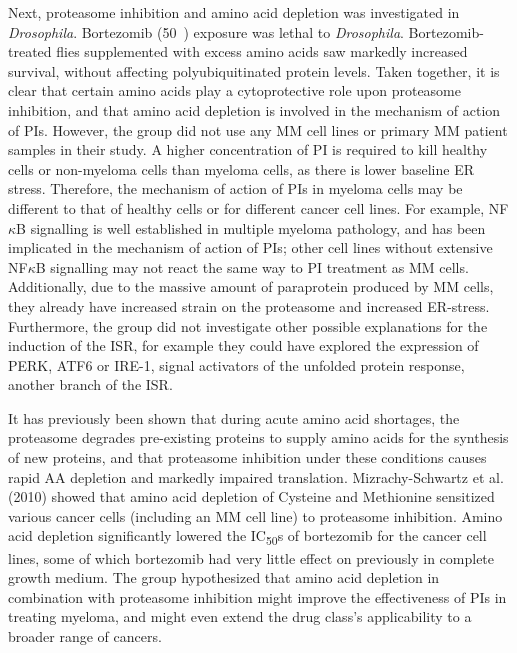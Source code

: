 Next, proteasome inhibition and amino acid depletion was investigated in \textit{Drosophila}\cite{suraweera2012failure}.
Bortezomib (50\si{\micro\Molar}) exposure was lethal to \textit{Drosophila}.
Bortezomib-treated flies supplemented with excess amino acids saw markedly increased survival, without affecting polyubiquitinated protein levels.
Taken together, it is clear that certain amino acids play a cytoprotective role upon proteasome inhibition, and that amino acid depletion is involved in the mechanism of action of PIs.
However, the group did not use any MM cell lines or primary MM patient samples in their study.
A higher concentration of PI is required to kill healthy cells or non-myeloma cells than myeloma cells, as there is lower baseline ER stress.
Therefore, the mechanism of action of PIs in myeloma cells may be different to that of healthy cells or for different cancer cell lines.
For example, NF$\kappa$B signalling is well established in multiple myeloma pathology, and has been implicated in the mechanism of action of PIs; other cell lines without extensive NF$\kappa$B signalling may not react the same way to PI treatment as MM cells.
Additionally, due to the massive amount of paraprotein produced by MM cells, they already have increased strain on the proteasome and increased ER-stress.
Furthermore, the group did not investigate other possible explanations for the induction of the ISR, for example they could have explored the expression of PERK, ATF6 or IRE-1, signal activators of the unfolded protein response, another branch of the ISR\@.


It has previously been shown that during acute amino acid shortages, the proteasome degrades pre-existing proteins to supply amino acids for the synthesis of new proteins, and that proteasome inhibition under these conditions causes rapid AA depletion and markedly impaired translation\cite{vabulas2005protein}.
Mizrachy-Schwartz et al. (2010) showed that amino acid depletion of Cysteine and Methionine sensitized various cancer cells (including an MM cell line) to proteasome inhibition\cite{mizrachy2010amino}.
Amino acid depletion significantly lowered the IC\textsubscript{50}s of bortezomib for the cancer cell lines, some of which bortezomib had very little effect on previously in complete growth medium.
The group hypothesized that amino acid depletion in combination with proteasome inhibition might improve the effectiveness of PIs in treating myeloma, and might even extend the drug class's applicability to a broader range of cancers.

